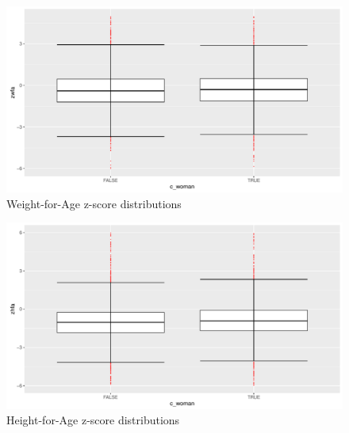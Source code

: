 \documentclass[a4paper,british]{article}\usepackage[]{graphicx}\usepackage[]{color}
\makeatletter
\def\maxwidth{ %
  \ifdim\Gin@nat@width>\linewidth
    \linewidth
  \else
    \Gin@nat@width
  \fi
}
\newenvironment{knitrout}{}{} %
\makeatother
\begin{document}
\begin{figure}[H]
\begin{centering}
\caption{Weight-for-Age z-score distributions}
\label{tab:waz_descr}
\par\end{centering}
\begin{knitrout}
\color{fgcolor}
\includegraphics[width=\maxwidth]{figures/latex-waz_boxplot-1} 

\end{knitrout}
\end{figure}

\begin{figure}[H]
\begin{centering}
\caption{Height-for-Age z-score distributions}
\label{tab:haz_descr}
\par\end{centering}
\begin{knitrout}
\color{fgcolor}
\includegraphics[width=\maxwidth]{figures/latex-haz_boxplot-1} 

\end{knitrout}
\end{figure}
\end{document}
